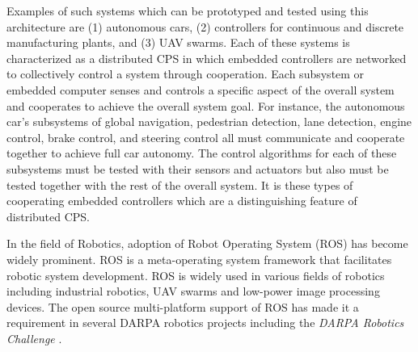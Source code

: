 Examples of such systems which can be prototyped and tested using this
architecture are (1) autonomous cars, (2) controllers for continuous
and discrete manufacturing plants, and (3) UAV swarms.  Each of these
systems is characterized as a distributed CPS in which embedded
controllers are networked to collectively control a system through
cooperation.  Each subsystem or embedded computer senses and controls
a specific aspect of the overall system and cooperates to achieve the
overall system goal.  For instance, the autonomous car's subsystems of
global navigation, pedestrian detection, lane detection, engine
control, brake control, and steering control all must communicate and
cooperate together to achieve full car autonomy.  The control
algorithms for each of these subsystems must be tested with their
sensors and actuators but also must be tested together with the rest
of the overall system.  It is these types of cooperating embedded controllers
which are a distinguishing feature of distributed CPS.


In the field of Robotics, adoption of Robot Operating System (ROS)
\cite{ROS} has become widely prominent. ROS is a meta-operating system
framework that facilitates robotic system development. ROS is widely
used in various fields of robotics including industrial robotics, UAV
swarms and low-power image processing devices. The open source
multi-platform support of ROS has made it a requirement in several
DARPA robotics projects including the \emph{DARPA Robotics Challenge}
\cite{DARPA_Robotics_Challenge}.


